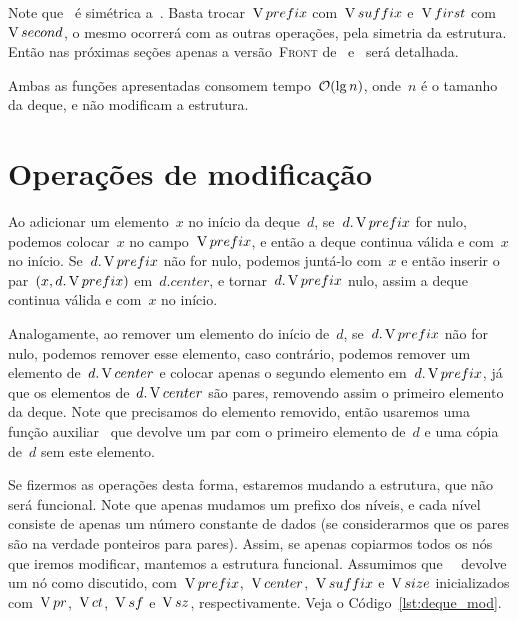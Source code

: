 \documentclass[main.tex]{subfiles}
\begin{document}
Note que~ é simétrica a~. Basta trocar~$\operatorname{V}{prefix}$ com~$\operatorname{V}{suffix}$ e~$\operatorname{V}{first}$ com~$\operatorname{V}{second}$, o mesmo ocorrerá com as outras operações, pela simetria da estrutura. Então nas próximas seções apenas a versão~\textsc{Front} de~ e~ será detalhada.

Ambas as funções apresentadas consomem tempo~$\mathcal{O}(\lg n)$, onde~$n$ é o tamanho da deque, e não modificam a estrutura.

\section{Operações de modificação}

Ao adicionar um elemento~$x$ no início da deque~$d$, se~$d.\operatorname{V}{prefix}$ for nulo, podemos colocar~$x$ no campo~$\operatorname{V}{prefix}$, e então a deque continua válida e com~$x$ no início. Se~$d.\operatorname{V}{prefix}$ não for nulo, podemos juntá-lo com~$x$ e então inserir o par~$(x, d.\operatorname{V}{prefix})$ em~$d.center$, e tornar~$d.\operatorname{V}{prefix}$ nulo, assim a deque continua válida e com~$x$ no início.

Analogamente, ao remover um elemento do início de~$d$, se~$d.\operatorname{V}{prefix}$ não for nulo, podemos remover esse elemento, caso contrário, podemos remover um elemento de~$d.\operatorname{V}{center}$ e colocar apenas o segundo elemento em~$d.\operatorname{V}{prefix}$, já que os elementos de~$d.\operatorname{V}{center}$ são pares, removendo assim o primeiro elemento da deque. Note que precisamos do elemento removido, então usaremos uma função auxiliar~ que devolve um par com o primeiro elemento de~$d$ e uma cópia de~$d$ sem este elemento.

Se fizermos as operações desta forma, estaremos mudando a estrutura, que não será funcional. Note que apenas mudamos um prefixo dos níveis, e cada nível consiste de apenas um número constante de dados (se considerarmos que os pares são na verdade ponteiros para pares).
Assim, se apenas copiarmos todos os nós que iremos modificar, mantemos a estrutura funcional. Assumimos que~\mbox{ } devolve um nó como discutido, com~$\operatorname{V}{prefix}$,~$\operatorname{V}{center}$,~$\operatorname{V}{suffix}$ e~$\operatorname{V}{size}$ inicializados com~$\operatorname{V}{pr}$,~$\operatorname{V}{ct}$,~$\operatorname{V}{sf}$ e~$\operatorname{V}{sz}$, respectivamente. Veja o Código~\ref{lst:deque_mod}.
\end{document}
